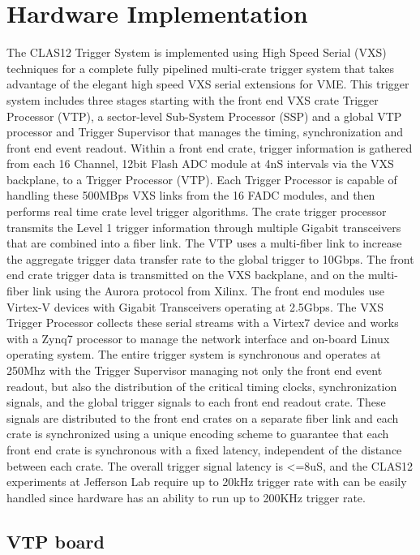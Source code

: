\section{Hardware Implementation}

The CLAS12 Trigger System is implemented using High Speed Serial (VXS) techniques for a complete fully pipelined multi-crate trigger system that takes advantage of the elegant high speed VXS serial extensions for VME.  This trigger system includes three stages starting with the front end VXS crate Trigger Processor (VTP), a sector-level Sub-System Processor (SSP) and a global VTP processor and Trigger Supervisor that manages the timing, synchronization and front end event readout.  
Within a front end crate, trigger information is gathered from each 16 Channel, 12bit Flash ADC module at 4nS intervals via the VXS backplane, to a Trigger Processor (VTP).  Each Trigger Processor is capable of handling these 500MBps VXS links from the 16 FADC modules, and then performs real time crate level trigger algorithms.  The crate trigger processor transmits the Level 1 trigger information through multiple Gigabit transceivers that are combined into a fiber link.  The VTP uses a multi-fiber link to increase the aggregate trigger data transfer rate to the global trigger to 10Gbps.
The front end crate trigger data is transmitted on the VXS backplane, and on the multi-fiber link using the Aurora protocol from Xilinx.  The front end modules use Virtex-V devices with Gigabit Transceivers operating at 2.5Gbps. The VXS Trigger Processor collects these serial streams with a Virtex7 device and works with a Zynq7 processor to manage the network interface and on-board Linux operating system.
The entire trigger system is synchronous and operates at 250Mhz with the Trigger Supervisor managing not only the front end event readout, but also the distribution of the critical timing clocks, synchronization signals, and the global trigger signals to each front end readout crate.  These signals are distributed to the front end crates on a separate fiber link and each crate is synchronized using a unique encoding scheme to guarantee that each front end crate is synchronous with a fixed latency, independent of the distance between each crate.  The overall trigger signal latency is <=8uS, and the CLAS12 experiments at Jefferson Lab require up to 20kHz trigger rate with can be easily handled since hardware has an ability to run up to 200KHz trigger rate.


\subsection{VTP board}

